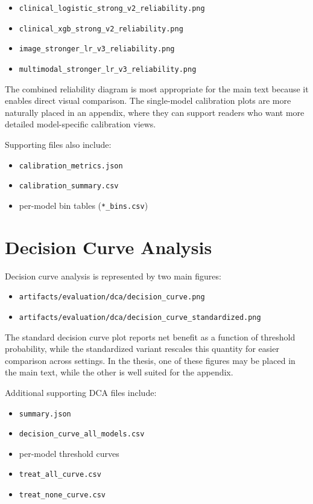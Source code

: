 \begin{itemize}
    \item \texttt{clinical\_logistic\_strong\_v2\_reliability.png}
    \item \texttt{clinical\_xgb\_strong\_v2\_reliability.png}
    \item \texttt{image\_stronger\_lr\_v3\_reliability.png}
    \item \texttt{multimodal\_stronger\_lr\_v3\_reliability.png}
\end{itemize}

The combined reliability diagram is most appropriate for the main text because it enables direct visual comparison. The single-model calibration plots are more naturally placed in an appendix, where they can support readers who want more detailed model-specific calibration views.

Supporting files also include:
\begin{itemize}
    \item \texttt{calibration\_metrics.json}
    \item \texttt{calibration\_summary.csv}
    \item per-model bin tables (\texttt{*\_bins.csv})
\end{itemize}

\section{Decision Curve Analysis}

Decision curve analysis is represented by two main figures:

\begin{itemize}
    \item \texttt{artifacts/evaluation/dca/decision\_curve.png}
    \item \texttt{artifacts/evaluation/dca/decision\_curve\_standardized.png}
\end{itemize}

The standard decision curve plot reports net benefit as a function of threshold probability, while the standardized variant rescales this quantity for easier comparison across settings. In the thesis, one of these figures may be placed in the main text, while the other is well suited for the appendix.

Additional supporting DCA files include:
\begin{itemize}
    \item \texttt{summary.json}
    \item \texttt{decision\_curve\_all\_models.csv}
    \item per-model threshold curves
    \item \texttt{treat\_all\_curve.csv}
    \item \texttt{treat\_none\_curve.csv}
\end{itemize}

